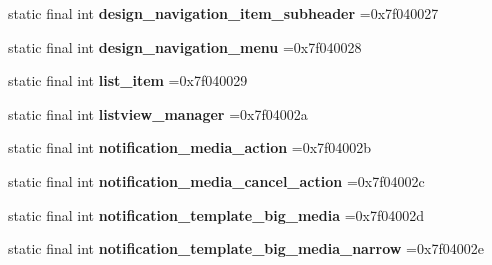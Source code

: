 \begin{DoxyCompactItemize}
\item 
\hypertarget{classcheck_1_1test_1_1_r_1_1layout_ad56c699600b2bbf7a268151c753dfd4d}{}static final int {\bfseries design\+\_\+navigation\+\_\+item\+\_\+subheader} =0x7f040027\label{classcheck_1_1test_1_1_r_1_1layout_ad56c699600b2bbf7a268151c753dfd4d}

\item 
\hypertarget{classcheck_1_1test_1_1_r_1_1layout_a26d5579b82f2e956b80fc225e9003764}{}static final int {\bfseries design\+\_\+navigation\+\_\+menu} =0x7f040028\label{classcheck_1_1test_1_1_r_1_1layout_a26d5579b82f2e956b80fc225e9003764}

\item 
\hypertarget{classcheck_1_1test_1_1_r_1_1layout_a936f090e87e303f1a37ecf9801722a43}{}static final int {\bfseries list\+\_\+item} =0x7f040029\label{classcheck_1_1test_1_1_r_1_1layout_a936f090e87e303f1a37ecf9801722a43}

\item 
\hypertarget{classcheck_1_1test_1_1_r_1_1layout_a0ea312ebbce4c717f966391b1474d4a8}{}static final int {\bfseries listview\+\_\+manager} =0x7f04002a\label{classcheck_1_1test_1_1_r_1_1layout_a0ea312ebbce4c717f966391b1474d4a8}

\item 
\hypertarget{classcheck_1_1test_1_1_r_1_1layout_a0602ece9384a2ea900e3b397542a2f86}{}static final int {\bfseries notification\+\_\+media\+\_\+action} =0x7f04002b\label{classcheck_1_1test_1_1_r_1_1layout_a0602ece9384a2ea900e3b397542a2f86}

\item 
\hypertarget{classcheck_1_1test_1_1_r_1_1layout_ae91122be0c178752009db64dc2251665}{}static final int {\bfseries notification\+\_\+media\+\_\+cancel\+\_\+action} =0x7f04002c\label{classcheck_1_1test_1_1_r_1_1layout_ae91122be0c178752009db64dc2251665}

\item 
\hypertarget{classcheck_1_1test_1_1_r_1_1layout_a33227181f9b46f240c767cdc0fc7e884}{}static final int {\bfseries notification\+\_\+template\+\_\+big\+\_\+media} =0x7f04002d\label{classcheck_1_1test_1_1_r_1_1layout_a33227181f9b46f240c767cdc0fc7e884}

\item 
\hypertarget{classcheck_1_1test_1_1_r_1_1layout_ac758610a4c899de9186b0c6d7ade6afa}{}static final int {\bfseries notification\+\_\+template\+\_\+big\+\_\+media\+\_\+narrow} =0x7f04002e\label{classcheck_1_1test_1_1_r_1_1layout_ac758610a4c899de9186b0c6d7ade6afa}


\end{DoxyCompactItemize}
